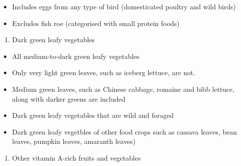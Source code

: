 \documentclass[12pt,]{book}
\providecommand{\tightlist}{%
  \setlength{\itemsep}{0pt}\setlength{\parskip}{0pt}}
\theoremstyle{definition}
\theoremstyle{definition}
\theoremstyle{definition}
\theoremstyle{remark}
\begin{document}
\begin{itemize}
\tightlist
\item
  Includes eggs from any type of bird (domesticated poultry and wild
  birds)
\item
  Excludes fish roe (categorised with small protein foods)
\end{itemize}

\begin{enumerate}
\def\labelenumi{\arabic{enumi}.}
\setcounter{enumi}{6}
\tightlist
\item
  Dark green leafy vegetables
\end{enumerate}

\begin{itemize}
\tightlist
\item
  All medium-to-dark green leafy vegetables
\item
  Only very light green leaves, such as iceberg lettuce, are not.
\item
  Medium green leaves, such as Chinese cabbage, romaine and bibb
  lettuce, along with darker greens are included
\item
  Dark green leafy vegetables that are wild and foraged
\item
  Dark green leafy vegetbles of other food crops such as cassava leaves,
  bean leaves, pumpkin leaves, amaranth leaves)
\end{itemize}

\begin{enumerate}
\def\labelenumi{\arabic{enumi}.}
\setcounter{enumi}{7}
\tightlist
\item
  Other vitamin A-rich fruits and vegetables
\end{enumerate}
\end{document}
